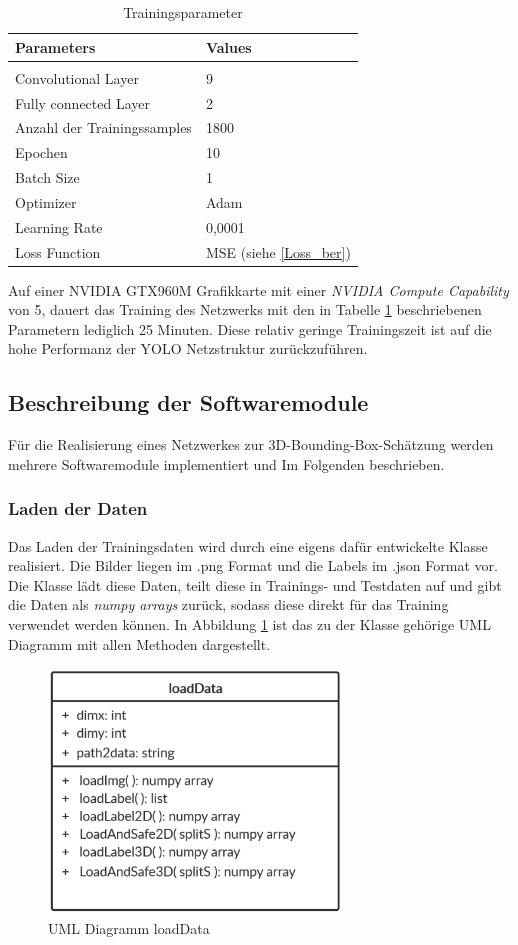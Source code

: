 \begin{table}[!htb]

\centering
\caption{Trainingsparameter}
\begin{tabular}{ll}
\label{trainings_param}
\textbf{Parameters}                  & \textbf{Values} \\ \hline
\\Convolutional Layer        & 9      \\
Fully connected Layer       & 2      \\
Anzahl der Trainingssamples & 1800    \\
Epochen                  & 10     \\
Batch Size                  & 1     \\
Optimizer                   & Adam   \\
Learning Rate               & 0,0001 \\
Loss Function               & MSE (siehe \ref{Loss_ber})   
\end{tabular}
\end{table}
Auf einer NVIDIA GTX960M Grafikkarte mit einer \textit{NVIDIA Compute Capability} von 5, dauert das Training des Netzwerks mit den in Tabelle \ref{trainings_param} beschriebenen Parametern lediglich 25 Minuten. Diese relativ geringe Trainingszeit ist auf die hohe Performanz der YOLO Netzstruktur zurückzuführen.   
\subsection{Beschreibung der Softwaremodule}
Für die Realisierung eines Netzwerkes zur 3D-Bounding-Box-Schätzung werden mehrere Softwaremodule implementiert und Im Folgenden beschrieben. 
\subsubsection{Laden der Daten}
Das Laden der Trainingsdaten wird durch eine eigens dafür entwickelte Klasse realisiert. Die Bilder liegen im .png Format und die Labels im .json Format vor. Die Klasse lädt diese Daten, teilt diese in Trainings- und Testdaten auf und gibt die Daten als \textit{numpy arrays} zurück, sodass diese direkt für das Training verwendet werden können. In Abbildung \ref{UML_load} ist das zu der Klasse gehörige UML Diagramm mit allen Methoden dargestellt.
\begin{figure}[!htb]
  \centering
  \includegraphics[width=7.8cm]{Abb/ULM_class_loadData.PNG}
  \caption{UML Diagramm loadData}
  \label{UML_load}
\end{figure} 
